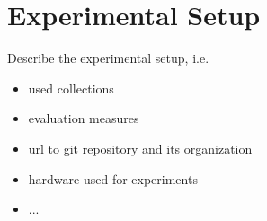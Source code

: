 \section{Experimental Setup}
\label{sec:setup}

Describe the experimental setup, i.e.
\begin{itemize}
	\item used collections
	\item evaluation measures
	\item url to git repository and its organization
	\item hardware used for experiments
	\item ...
\end{itemize}